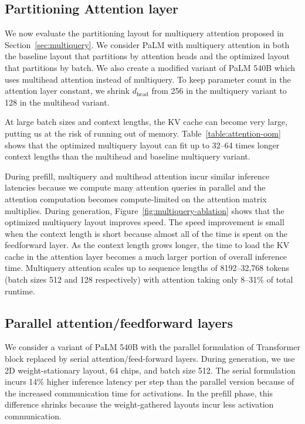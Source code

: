 \subsection{Partitioning Attention layer}\label{sec:attention-ablation}
We now evaluate the partitioning layout for multiquery attention proposed in Section~\ref{sec:multiquery}. We consider PaLM with multiquery attention in both the baseline layout that partitions by attention heads and the optimized layout that partitions by batch. We also create a modified variant of PaLM 540B which uses multihead attention instead of multiquery. To keep parameter count in the attention layer constant, we shrink $d_{\textrm{head}}$ from 256 in the multiquery variant to 128 in the multihead variant.

At large batch sizes and context lengths, the KV cache can become very large, putting us at the risk of running out of memory. Table~\ref{table:attention-oom} shows that the optimized multiquery layout can fit up to 32--64 times longer context lengths than the multihead and baseline multiquery variant.

During prefill, multiquery and multihead attention incur similar inference latencies because we compute many attention queries in parallel and the attention computation becomes compute-limited on the attention matrix multiplies. During generation, Figure~\ref{fig:multiquery-ablation} shows that the optimized multiquery layout improves speed. The speed improvement is small when the context length is short because almost all of the time is spent on the feedforward layer. As the context length grows longer, the time to load the KV cache in the attention layer becomes a much larger portion of overall inference time. Multiquery attention scales up to sequence lengths of 8192--32,768 tokens (batch sizes 512 and 128 respectively) with attention taking only 8--31\% of total runtime.

\subsection{Parallel attention/feedforward layers}\label{sec:parallel-ablation}

We consider a variant of PaLM 540B with the parallel formulation of Transformer block replaced by serial attention/feed-forward layers. During generation, we use 2D weight-stationary layout, 64 chips, and batch size 512. The serial formulation incurs 14\% higher inference latency per step than the parallel version because of the increased communication time for activations. In the prefill phase, this difference shrinks because the weight-gathered layouts incur less activation communication.

